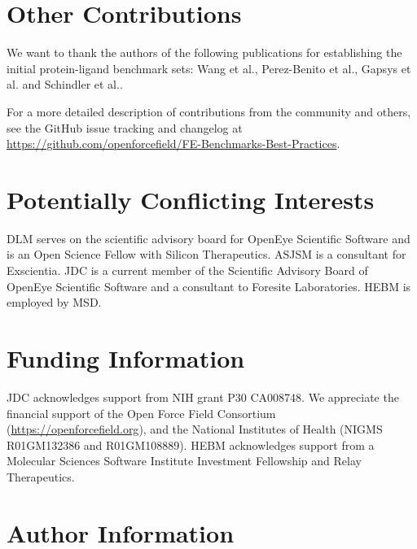\documentclass[9pt,bestpractices]{livecoms}
\newcommand{\githubrepository}{\url{https://github.com/openforcefield/FE-Benchmarks-Best-Practices}}  %
\begin{document}
\section{Other Contributions}
%

We want to thank the authors of the following publications for establishing the initial protein-ligand benchmark sets: Wang et al.\cite{wang_accurate_2015}, Perez-Benito et al.\cite{perez-benito_predicting_2019}, Gapsys et al.\cite{gapsys_large_2020} and Schindler et al.\cite{schindler_largescale_2020}.

For a more detailed description of contributions from the community and others, see the GitHub issue tracking and changelog at \githubrepository.

\section{Potentially Conflicting Interests}

DLM serves on the scientific advisory board for OpenEye Scientific Software and is an Open Science Fellow with Silicon Therapeutics.
ASJSM is a consultant for Exscientia.
JDC is a current member of the Scientific Advisory Board of OpenEye Scientific Software and a consultant to Foresite Laboratories.
HEBM is employed by MSD.
\section{Funding Information}
JDC acknowledges support from NIH grant P30 CA008748.
We appreciate the financial support of the Open Force Field Consortium (\url{https://openforcefield.org}), and the National Institutes of Health (NIGMS R01GM132386 and R01GM108889).
HEBM acknowledges support from a Molecular Sciences Software Institute Investment Fellowship and Relay Therapeutics.


\section*{Author Information}
\makeorcid




\end{document}
